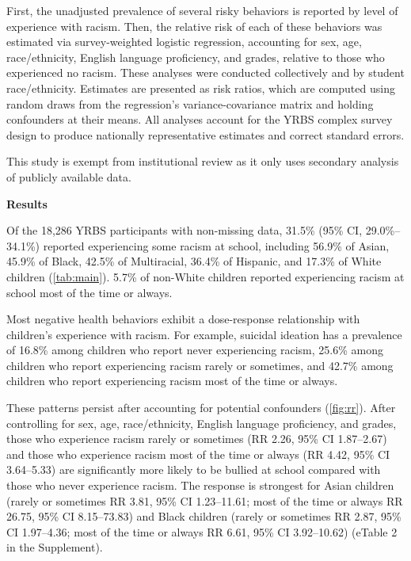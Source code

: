 \documentclass[12pt]{article}
\begin{document}
First, the unadjusted prevalence of several risky behaviors is reported by level of
experience with racism. Then, the relative risk of each of these
behaviors was estimated via survey-weighted logistic regression, accounting for sex, age,
race/ethnicity, English language proficiency, and grades, relative to those who
experienced no racism.
These analyses were conducted collectively and by student race/ethnicity. Estimates are
presented as risk ratios, which are computed using random draws from the regression's
variance-covariance matrix and holding confounders at their means.\cite{king2000making}
All analyses account for the YRBS complex survey design to produce nationally
representative estimates and correct standard errors.

This study is exempt from institutional review as it only uses secondary analysis of
publicly available data.

\vspace{6pt}

\noindent\textbf{Results}

Of the 18,286 YRBS participants with non-missing data,
31.5\% (95\% CI, 29.0\%--34.1\%)
reported experiencing some racism at school, including
56.9\% of Asian,
45.9\% of Black,
42.5\% of Multiracial,
36.4\% of Hispanic, and
17.3\% of White children (\autoref{tab:main}).
5.7\% of non-White children reported experiencing racism at school most of the
time or always.

Most negative health behaviors exhibit a dose-response relationship with children's
experience with racism. For example, suicidal
ideation has a prevalence of 16.8\% among children who report never
experiencing racism, 25.6\% among children who report experiencing racism rarely
or sometimes, and 42.7\% among children who report experiencing racism most of
the time or always.

These patterns persist after accounting for potential confounders (\autoref{fig:rr}). After controlling for
sex, age, race/ethnicity, English language proficiency, and grades, those who experience
racism rarely or sometimes (RR 2.26, 95\% CI
1.87--2.67) and those who experience racism most of the time
or always (RR 4.42, 95\% CI
3.64--5.33) are significantly more likely to be bullied at
school compared with those who never experience racism. The response is strongest for
Asian children (rarely or sometimes RR 3.81, 95\% CI 1.23--11.61; most of the time or always RR 26.75, 95\% CI 8.15--73.83) and Black children (rarely or sometimes RR 2.87, 95\% CI 1.97--4.36; most of the time or always RR 6.61, 95\% CI 3.92--10.62) (eTable 2 in the Supplement).
\end{document}
